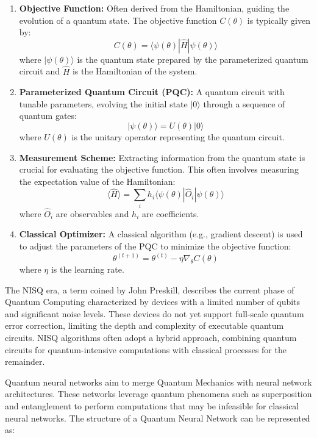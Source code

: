 \documentclass[12pt,a4paper]{report}
\begin{document}
\begin{enumerate}
  \item \textbf{Objective Function:} Often derived from the Hamiltonian, guiding the evolution of a quantum state. The objective function \(C(\theta)\) is typically given by:
        \[
          C(\theta) = \langle \psi(\theta) | \hat{H} | \psi(\theta) \rangle
        \]
        where \(| \psi(\theta) \rangle\) is the quantum state prepared by the parameterized quantum circuit and \(\hat{H}\) is the Hamiltonian of the system.

  \item \textbf{Parameterized Quantum Circuit (PQC):} A quantum circuit with tunable parameters, evolving the initial state \(|0\rangle\) through a sequence of quantum gates:
        \[
          | \psi(\theta) \rangle = U(\theta) | 0 \rangle
        \]
        where \(U(\theta)\) is the unitary operator representing the quantum circuit.

  \item \textbf{Measurement Scheme:} Extracting information from the quantum state is crucial for evaluating the objective function. This often involves measuring the expectation value of the Hamiltonian:
        \[
          \langle \hat{H} \rangle = \sum_{i} h_i \langle \psi(\theta) | \hat{O}_i | \psi(\theta) \rangle
        \]
        where \(\hat{O}_i\) are observables and \(h_i\) are coefficients.

  \item \textbf{Classical Optimizer:} A classical algorithm (e.g., gradient descent) is used to adjust the parameters of the PQC to minimize the objective function:
        \[
          \theta^{(t+1)} = \theta^{(t)} - \eta \nabla_\theta C(\theta)
        \]
        where \(\eta\) is the learning rate.
\end{enumerate}
The NISQ era, a term coined by John Preskill, describes the current phase of Quantum Computing characterized by devices with a limited number of qubits and significant noise levels. These devices do not yet support full-scale quantum error correction, limiting the depth and complexity of executable quantum circuits. NISQ algorithms often adopt a hybrid approach, combining quantum circuits for quantum-intensive computations with classical processes for the remainder.

Quantum neural networks aim to merge Quantum Mechanics with neural network architectures. These networks leverage quantum phenomena such as superposition and entanglement to perform computations that may be infeasible for classical neural networks. The structure of a Quantum Neural Network can be represented as:
\end{document}
